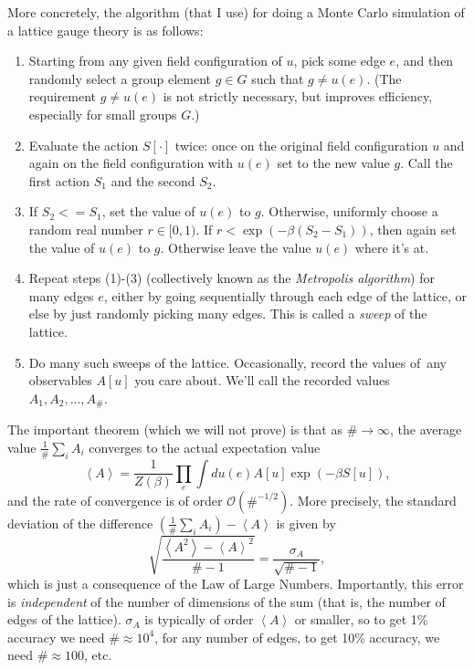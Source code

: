 \documentclass[9pt,twocolumn,twoside]{article}
\begin{document}
More concretely, the algorithm (that I use) for doing a Monte Carlo simulation of a lattice gauge theory is as follows:
\begin{enumerate}
\item Starting from any given field configuration of $u$, pick some edge $e$, and then randomly select a group element $g\in G$ such that $g\neq u(e)$.  (The requirement $g\neq u(e)$ is not strictly necessary, but improves efficiency, especially for small groups $G$.)
\item Evaluate the action $S[\cdot]$ twice: once on the original field configuration $u$ and again on the field configuration with $u(e)$ set to the new value $g$.  Call the first action $S_1$ and the second $S_2$.
\item If $S_2<=S_1$, set the value of $u(e)$ to $g$.  Otherwise, uniformly choose a random real number $r\in [0,1)$.  If $r<\exp\left(-\beta (S_2-S_1)\right)$, then again set the value of $u(e)$ to $g$.  Otherwise leave the value $u(e)$ where it's at.
\item Repeat steps (1)-(3) (collectively known as the \textit{Metropolis algorithm}) for many edges $e$, either by going sequentially through each edge of the lattice, or else by just randomly picking many edges.  This is called a \textit{sweep} of the lattice.
\item Do many such sweeps of the lattice.  Occasionally, record the values of\ any observables $A[u]$ you care about.  We'll call the recorded values $A_1,A_2,...,A_\#$.
\end{enumerate}
The important theorem (which we will not prove) is that as $\#\rightarrow \infty$, the average value $\frac{1}{\#} \sum_i A_i$ converges to the actual expectation value
\[ \left<A\right> = \frac{1}{Z(\beta)}\prod_e \int du(e) A[u] \exp\left(-\beta S[u]\right),\]
and the rate of convergence is of order $\mathcal{O}(\#^{-1/2})$.  More precisely, the standard deviation of the difference $\left(\frac{1}{\#} \sum_i A_i\right) - \left<A\right>$ is given by 
\[\sqrt{\frac{\left<A^2\right>-\left<A\right>^2}{\#-1}} = \frac{\sigma_A}{\sqrt{\#-1}},\]
which is just a consequence of the Law of Large Numbers.  Importantly, this error is \textit{independent} of the number of dimensions of the sum (that is, the number of edges of the lattice).  $\sigma_A$ is typically of order $\left<A\right>$ or smaller, so to get 1\% accuracy we need $\# \approx 10^4$, for any number of edges, to get 10\% accuracy, we need $\#\approx 100$, etc. 

\end{document}
